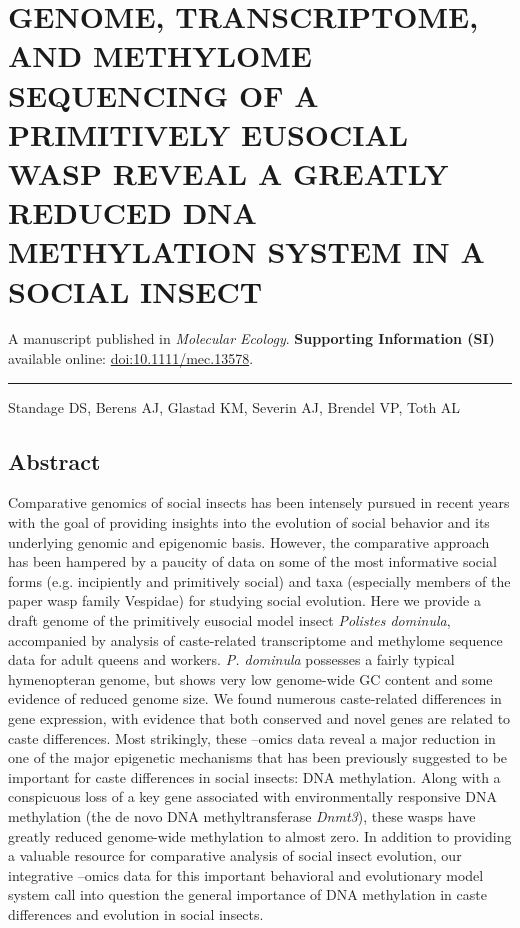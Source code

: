 \chapter{GENOME, TRANSCRIPTOME, AND METHYLOME SEQUENCING OF A PRIMITIVELY EUSOCIAL WASP REVEAL A GREATLY REDUCED DNA METHYLATION SYSTEM IN A SOCIAL INSECT}

A manuscript published in \textit{Molecular Ecology}.
\textbf{Supporting Information (SI)} available online: \href{http://dx.doi.org/10.1111/mec.13578}{doi:10.1111/mec.13578}.

\noindent\hfil\rule{0.5\textwidth}{.4pt}\hfil

Standage DS, Berens AJ, Glastad KM, Severin AJ, Brendel VP, Toth AL

\section{Abstract}

Comparative genomics of social insects has been intensely pursued in
recent years with the goal of providing insights into the evolution of
social behavior and its underlying genomic and epigenomic basis.
However, the comparative approach has been hampered by a paucity of data
on some of the most informative social forms (e.g. incipiently and
primitively social) and taxa (especially members of the paper wasp
family Vespidae) for studying social evolution. Here we provide a draft
genome of the primitively eusocial model insect \textit{Polistes
dominula}, accompanied by analysis of caste-related transcriptome and
methylome sequence data for adult queens and workers. \textit{P. dominula}
possesses a fairly typical hymenopteran genome, but shows very low
genome-wide GC content and some evidence of reduced genome size. We
found numerous caste-related differences in gene expression, with
evidence that both conserved and novel genes are related to caste
differences. Most strikingly, these --omics data reveal a major
reduction in one of the major epigenetic mechanisms that has been
previously suggested to be important for caste differences in social
insects: DNA methylation. Along with a conspicuous loss of a key gene
associated with environmentally responsive DNA methylation (the de novo
DNA methyltransferase \textit{Dnmt3}), these wasps have greatly reduced
genome-wide methylation to almost zero. In addition to providing a
valuable resource for comparative analysis of social insect evolution,
our integrative --omics data for this important behavioral and
evolutionary model system call into question the general importance of
DNA methylation in caste differences and evolution in social insects.

